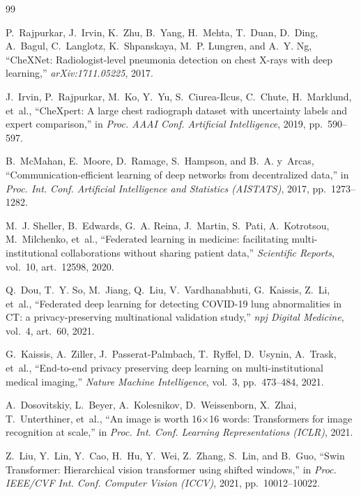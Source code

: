 \documentclass[letterpaper, conference]{IEEEtran}
\begin{document}
\balance
\begin{thebibliography}{99}

P.~Rajpurkar, J.~Irvin, K.~Zhu, B.~Yang, H.~Mehta, T.~Duan, D.~Ding, A.~Bagul,
C.~Langlotz, K.~Shpanskaya, M.~P. Lungren, and A.~Y. Ng,
``CheXNet: Radiologist-level pneumonia detection on chest X-rays with deep learning,''
\emph{arXiv:1711.05225}, 2017.

J.~Irvin, P.~Rajpurkar, M.~Ko, Y.~Yu, S.~Ciurea-Ilcus, C.~Chute, H.~Marklund, et~al.,
``CheXpert: A large chest radiograph dataset with uncertainty labels and expert comparison,''
in \emph{Proc. AAAI Conf. Artificial Intelligence}, 2019, pp.~590--597.

B.~McMahan, E.~Moore, D.~Ramage, S.~Hampson, and B.~A. y~Arcas,
``Communication-efficient learning of deep networks from decentralized data,''
in \emph{Proc. Int. Conf. Artificial Intelligence and Statistics (AISTATS)}, 2017,
pp.~1273--1282.

M.~J. Sheller, B.~Edwards, G.~A. Reina, J.~Martin, S.~Pati, A.~Kotrotsou,
M.~Milchenko, et~al.,
``Federated learning in medicine: facilitating multi-institutional collaborations
without sharing patient data,''
\emph{Scientific Reports}, vol.~10, art.~12598, 2020.

Q.~Dou, T.~Y. So, M.~Jiang, Q.~Liu, V.~Vardhanabhuti, G.~Kaissis, Z.~Li, et~al.,
``Federated deep learning for detecting COVID-19 lung abnormalities in CT: a
privacy-preserving multinational validation study,''
\emph{npj Digital Medicine}, vol.~4, art.~60, 2021.

G.~Kaissis, A.~Ziller, J.~Passerat-Palmbach, T.~Ryffel, D.~Usynin, A.~Trask, et~al.,
``End-to-end privacy preserving deep learning on multi-institutional medical imaging,''
\emph{Nature Machine Intelligence}, vol.~3, pp.~473--484, 2021.

A.~Dosovitskiy, L.~Beyer, A.~Kolesnikov, D.~Weissenborn, X.~Zhai, T.~Unterthiner, et~al.,
``An image is worth 16$\times$16 words: Transformers for image recognition at scale,''
in \emph{Proc. Int. Conf. Learning Representations (ICLR)}, 2021.

Z.~Liu, Y.~Lin, Y.~Cao, H.~Hu, Y.~Wei, Z.~Zhang, S.~Lin, and B.~Guo,
``Swin Transformer: Hierarchical vision transformer using shifted windows,''
in \emph{Proc. IEEE/CVF Int. Conf. Computer Vision (ICCV)}, 2021, pp.~10012--10022.


\end{thebibliography}
\end{document}
